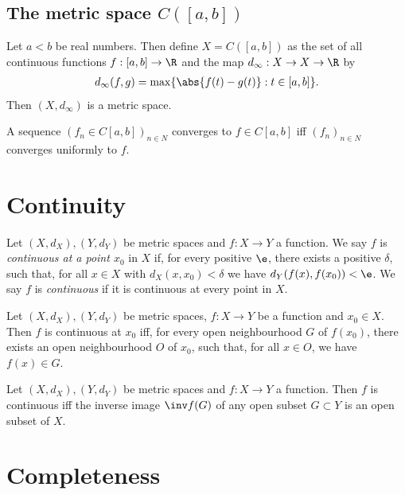 \documentclass{article}
\begin{document}
\subsection{The metric space $C([a,b])$}

\begin{theorem}
	Let $a<b$ be real numbers. Then define $X=C([a,b])$ as the set of all continuous functions
	$f:[a,b]\to\R$ and the map $d_\infty:X\to X\to\R$ by
	\begin{align*}
		d_\infty(f,g) = \max\{\abs{f(t)-g(t)}: t\in[a,b]\}.
	\end{align*}
	Then $(X,d_\infty)$ is a metric space.
\end{theorem}

\begin{lemma}
	A sequence $(f_n\in C[a,b])_{n\in N}$ converges to $f\in C[a,b]$ iff $(f_n)_{n\in N}$
	converges uniformly to $f$.
\end{lemma}

\section{Continuity}

\begin{definition}
	Let $(X,d_X),(Y,d_Y)$ be metric spaces and $f:X\to Y$ a function. We say $f$ is \emph{continuous
		at a point $x_0$} in $X$ if, for every positive $\e$, there exists a positive $\delta$, such that,
	for all $x\in X$ with $d_X(x,x_0)<\delta$ we have $d_Y(f(x),f(x_0))<\e$.
	We say $f$ is \emph{continuous} if it is continuous at every point in $X$.
\end{definition}

\begin{proposition}[6.2]
	Let $(X,d_X),(Y,d_Y)$ be metric spaces, $f:X\to Y$ be a function and $x_0\in X$. Then $f$ is continuous
	at $x_0$ iff, for every open neighbourhood $G$ of $f(x_0)$, there exists an open neighbourhood $O$ of
	$x_0$, such that, for all $x\in O$, we have $f(x)\in G$.
\end{proposition}

\begin{theorem}[6.5]
	Let $(X,d_X),(Y,d_Y)$ be metric spaces and $f:X\to Y$ a function. Then $f$ is continuous iff
	the inverse image $\inv f(G)$ of any open subset $G\subset Y$ is an open subset of $X$.
\end{theorem}

\section{Completeness}
\end{document}
